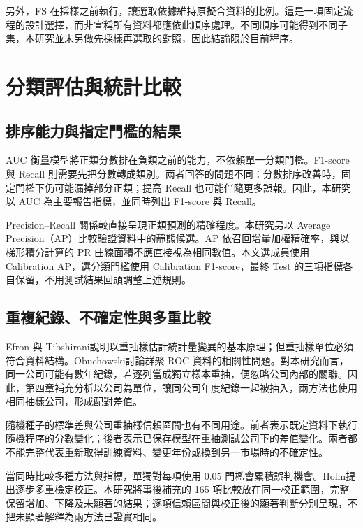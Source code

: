 另外，FS 在採樣之前執行，讓選取依據維持原擬合資料的比例。這是一項固定流程的設計選擇，而非宣稱所有資料都應依此順序處理。不同順序可能得到不同子集，本研究並未另做先採樣再選取的對照，因此結論限於目前程序。

\section{分類評估與統計比較}

\subsection{排序能力與指定門檻的結果}

AUC 衡量模型將正類分數排在負類之前的能力，不依賴單一分類門檻。F1-score 與 Recall 則需要先把分數轉成類別。兩者回答的問題不同：分數排序改善時，固定門檻下仍可能漏掉部分正類；提高 Recall 也可能伴隨更多誤報。因此，本研究以 AUC 為主要報告指標，並同時列出 F1-score 與 Recall。

Precision--Recall 關係較直接呈現正類預測的精確程度\autocite{saito2015pr}。本研究另以 Average Precision（AP）比較驗證資料中的靜態候選。AP 依召回增量加權精確率，與以梯形積分計算的 PR 曲線面積不應直接視為相同數值\autocite{sklearn-ap-docs}。本文選成員使用 Calibration AP，選分類門檻使用 Calibration F1-score，最終 Test 的三項指標各自保留，不用測試結果回頭調整上述規則。

\subsection{重複紀錄、不確定性與多重比較}

Efron 與 Tibshirani\autocite{efron1986bootstrap}說明以重抽樣估計統計量變異的基本原理；但重抽樣單位必須符合資料結構。Obuchowski\autocite{obuchowski1997clustered}討論群聚 ROC 資料的相關性問題。對本研究而言，同一公司可能有數年紀錄，若逐列當成獨立樣本重抽，便忽略公司內部的關聯。因此，第四章補充分析以公司為單位，讓同公司年度紀錄一起被抽入，兩方法也使用相同抽樣公司，形成配對差值。

隨機種子的標準差與公司重抽樣信賴區間也有不同用途。前者表示既定資料下執行隨機程序的分數變化；後者表示已保存模型在重抽測試公司下的差值變化。兩者都不能完整代表重新取得訓練資料、變更年份或換到另一市場時的不確定性。

當同時比較多種方法與指標，單獨對每項使用 0.05 門檻會累積誤判機會。Holm\autocite{holm1979multiple}提出逐步多重檢定校正。本研究將事後補充的 165 項比較放在同一校正範圍，完整保留增加、下降及未顯著的結果；逐項信賴區間與校正後的顯著判斷分別呈現，不把未顯著解釋為兩方法已證實相同。

